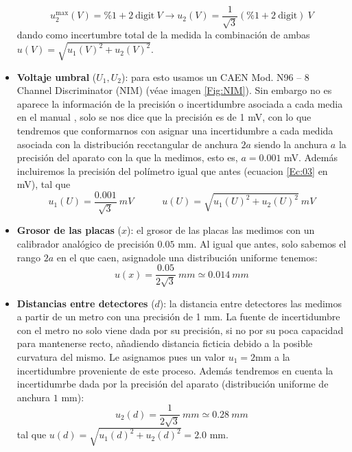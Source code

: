 \documentclass[11pt]{article}
\newcommand{\parentesis}[1]{\left( #1  \right)}
\newcommand{\tquad}{\quad \quad \quad}
\begin{document}
\begin{itemize}
	\begin{equation}
		u_2^{\max}(V) =  \% 1 + 2 \ \text{digit} \ \unit{V}  \rightarrow u_2(V) = \frac{1}{\sqrt{3}} \parentesis{  \% 1 + 2 \ \text{digit} } \label{Ec:03} \ \unit{V}
	\end{equation}
	dando como incertumbre total de la medida la combinación de ambas $u(V)=\sqrt{u_1(V)^2+u_2(V)^2}$.
	\item \textbf{Voltaje umbral} ($U_1,U_2$): para esto usamos un CAEN Mod. N96 – 8 Channel Discriminator (NIM) (véae imagen \ref{Fig:NIM}). Sin embargo no es aparece la información de la precisión o incertidumbre asociada a cada media en el manual \cite{CAEN_N96}, solo se nos dice que la precisión es de 1 mV, con lo que tendremos que conformarnos con asignar una incertidumbre a cada medida asociada con la distribución recctangular de anchura $2a$ siendo la anchura $a$ la precisión del aparato con la que la medimos, esto es, $a=0.001$ mV. Además incluiremos la precisión del polímetro igual que antes (ecuacion \ref{Ec:03} en mV), tal que
	      \begin{equation}
		      u_1 (U) = \frac{0.001}{\sqrt{3}} \ \unit{mV} \tquad u(U)=\sqrt{u_1(U)^2+u_2(U)^2} \ \unit{mV}
	      \end{equation}
	\item \textbf{Grosor de las placas} ($x$): el grosor de las placas las medimos con un calibrador analógico de precisión $0.05$ mm. Al igual que antes, solo sabemos el rango $2a$  en el que caen, asignadole una distribución uniforme tenemos:
	      \begin{equation}
		      u (x)  = \frac{0.05}{2\sqrt3} \ \unit{mm} \simeq 0.014 \ \unit{mm}
	      \end{equation}
	\item \textbf{Distancias entre detectores} ($d$): la distancia entre detectores las medimos a partir de un metro con una precisión de 1 mm. La fuente de incertidumbre con el metro no solo viene dada por su precisión, si no por su poca capacidad para mantenerse recto, añadiendo distancia ficticia debido a la posible curvatura del mismo. Le asignamos pues un valor $u_{1}=2$mm a la incertidumbre proveniente de este proceso. Además tendremos en cuenta la incertidumrbe dada por la precisión del aparato (distribución uniforme de anchura $1$ mm):
	      \begin{equation}
		      u_2 (d)  = \frac{1}{2\sqrt3} \ \unit{mm} \simeq 0.28 \ \unit{mm}
	      \end{equation}
	tal que $u(d)=\sqrt{u_1(d)^2+u_2(d)^2}=2.0$ mm.


\end{itemize}
\end{document}
